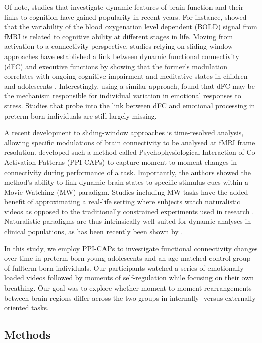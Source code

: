 Of note, studies that investigate dynamic features of brain function and their links to cognition have gained popularity in recent years. For instance, \citet{Garrett2013b} showed that the variability of the blood oxygenation level dependent (BOLD) signal from fMRI is related to cognitive ability at different stages in life. Moving from activation to a connectivity perspective, studies relying on sliding-window approaches have established a link between dynamic functional connectivity (dFC) and executive functions by showing that the former's modulation correlates with ongoing cognitive impairment \citep{Nguyen2017} and meditative states in children and adolescents \citep{Marusak2018}. Interestingly, using a similar approach, \citet{Tobia2017} found that dFC may be the mechanism responsible for individual variation in emotional responses to stress. Studies that probe into the link between dFC and emotional processing in preterm-born individuals are still largely missing. 


A recent development to sliding-window approaches is time-resolved analysis, allowing specific modulations of brain connectivity to be analysed at fMRI frame resolution. \citet{Freitas2020} developed such a method called Psychophysiological Interaction of Co-Activation Patterns (PPI-CAPs) to capture moment-to-moment changes in connectivity during performance of a task. Importantly, the authors showed the method's ability to link dynamic brain states to specific stimulus cues within a Movie Watching (MW) paradigm. Studies including MW tasks have the added benefit of approximating a real-life setting where subjects watch naturalistic videos as opposed to the traditionally constrained experiments used in research \citep{Vanderwal2019}. Naturalistic paradigms are thus intrinsically well-suited for dynamic analyses in clinical populations, as has been recently been shown by \citet{Bolton2020a}.


In this study, we employ PPI-CAPs to investigate functional connectivity changes over time in preterm-born young adolescents and an age-matched control group of fullterm-born individuals. Our participants watched a series of emotionally-loaded videos followed by moments of self-regulation while focusing on their own breathing. Our goal was to explore whether moment-to-moment rearrangements between brain regions differ across the two groups in internally- versus externally-oriented tasks.

\subsection{Methods}

